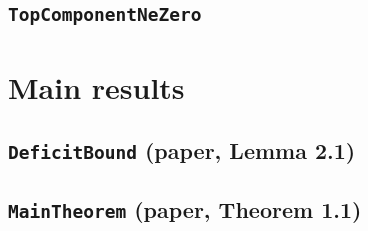 \documentclass[11pt]{amsart}
\theoremstyle{definition}
\begin{document}
\subsection{\texorpdfstring{\texttt{TopComponentNeZero}}{TopComponentNeZero}}\label{node:TopComponentNeZero}


\section{Main results}\label{sec:main}
\subsection{\texorpdfstring{\texttt{DeficitBound} (paper, Lemma 2.1)}{DeficitBound}}\label{node:DeficitBound}


\subsection{\texorpdfstring{\texttt{MainTheorem} (paper, Theorem 1.1)}{MainTheorem}}\label{node:MainTheorem}

\end{document}
